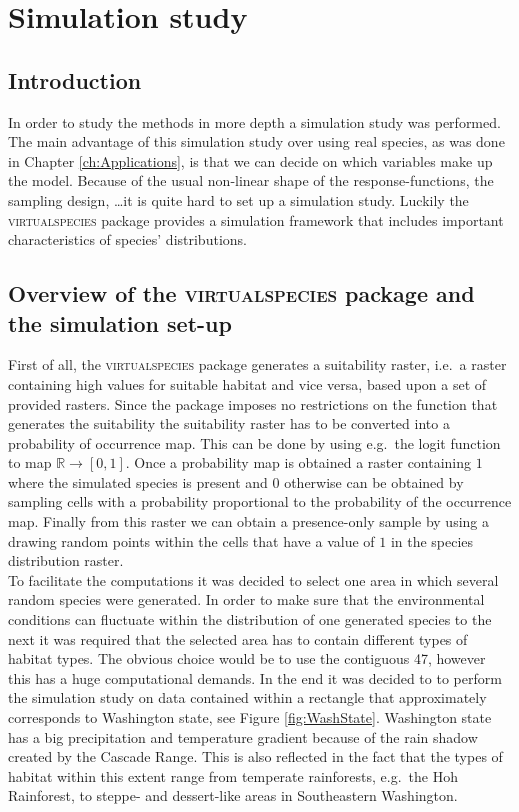 \chapter{Simulation study}
\label{chap:SimulationStudy}

\section{Introduction}
In order to study the methods in more depth a simulation study was performed. The main advantage of this simulation study over using real species, as was done in Chapter \ref{ch:Applications}, is that we can decide on which variables make up the model. Because of the usual non-linear shape of the response-functions, the sampling design, \dots it is quite hard to set up a simulation study. Luckily the
\textsc{virtualspecies} package \parencite{virtualspecies, leroy_virtualspecies_2015} provides a simulation framework that includes important characteristics of species' distributions.\\

\section{Overview of the \textsc{virtualspecies} package and the simulation set-up}

First of all, the \textsc{virtualspecies} package generates a suitability raster, i.e.\ a raster containing high values for suitable habitat and vice versa, based upon a set of provided rasters. Since the package imposes no restrictions on the function that generates the suitability the suitability raster has to be converted into a probability of occurrence map. This can be done by using e.g.\ the logit function to map $\mathbb{R} \to [0,1]$. Once a probability map is obtained a raster containing $1$ where the simulated species is present and $0$ otherwise can be obtained by sampling cells with a probability proportional to the probability of the occurrence map. Finally from this raster we can obtain a presence-only sample by using a drawing random points within the cells that have a value of $1$ in the species distribution raster.\\


To facilitate the computations it was decided to select one area in which several random species were generated. In order to make sure that the environmental conditions can fluctuate within the distribution of one generated species to the next it was required that the selected area has to contain different types of habitat types. The obvious choice would be to use the contiguous 47, however this has a huge computational demands. In the end it was decided to to perform the simulation study on data contained within a rectangle that approximately corresponds to Washington state, see Figure \ref{fig:WashState}. Washington state has a big precipitation and temperature gradient because of the rain shadow created by the Cascade Range. This is also reflected in the fact that the types of habitat within this extent range from temperate rainforests, e.g.\ the Hoh Rainforest, to steppe- and dessert-like areas in Southeastern Washington. \\

